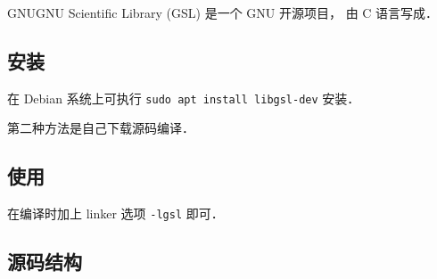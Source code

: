 
\begin{issues}
\issueDraft
\issueMissDepend
\end{issues}

GNUGNU Scientific Library (GSL) 是一个 GNU 开源项目， 由 C 语言写成．

\subsection{安装}
在 Debian 系统上可执行 \verb|sudo apt install libgsl-dev| 安装．

第二种方法是自己下载源码编译．

\subsection{使用}
在编译时加上 linker 选项 \verb|-lgsl| 即可．

\subsection{源码结构}
